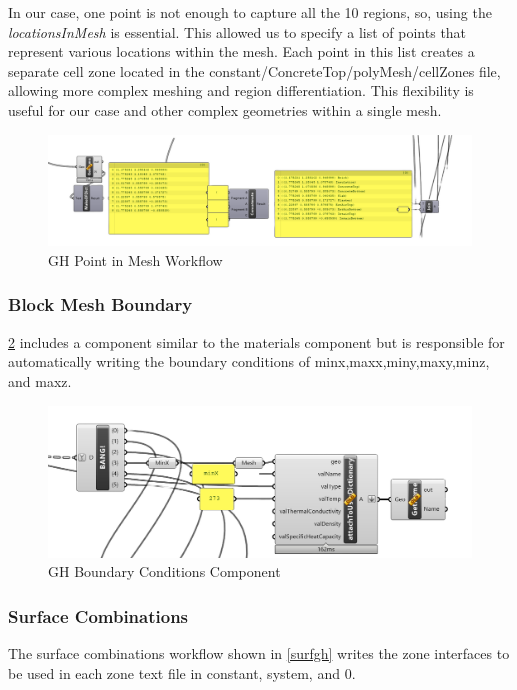 In our case, one point is not enough to capture all the 10 regions, so, using the \textit{locationsInMesh} is essential. This allowed us to specify a list of points that represent various locations within the mesh. Each point in this list creates a separate cell zone located in the constant/ConcreteTop/polyMesh/cellZones file, allowing more complex meshing and region differentiation. This flexibility is useful for our case and other complex geometries within a single mesh.

\begin{figure}[tbh]
\centering
\includegraphics[width=0.77\columnwidth]{Figures/locinmeshgh.png}
\hspace{0.7cm}
\caption{GH Point in Mesh Workflow}
\label{locgh}
\end{figure}





\subsubsection{Block Mesh Boundary}
\ref{blkmgh} includes a component similar to the materials component but is responsible for automatically writing the boundary conditions of minx,maxx,miny,maxy,minz, and maxz. 

\begin{figure}[tbh]
\centering
\includegraphics[width=0.77\columnwidth]{Figures/bcondgh.png}
\hspace{0.7cm}
\caption{GH Boundary Conditions Component}
\label{blkmgh}
\end{figure}




\subsubsection{Surface Combinations}
The surface combinations workflow shown in \ref{surfgh} writes the zone interfaces to be used in each zone text file in constant, system, and 0. 

